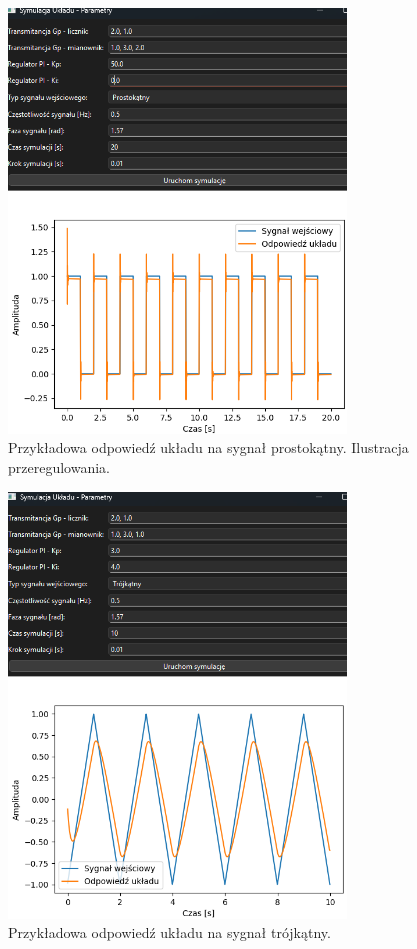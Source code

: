 \documentclass[12pt,a4paper]{article}
\begin{document}
\begin{figure}[h!]
    \centering
    \includegraphics[width=0.8\textwidth]{wykres3.png}
    \caption{Przykładowa odpowiedź układu na sygnał prostokątny. Ilustracja przeregulowania.}
\end{figure}

\begin{figure}[h!]
    \centering
    \includegraphics[width=0.8\textwidth]{wykres5.png}
    \caption{Przykładowa odpowiedź układu na sygnał trójkątny.}
\end{figure}
\end{document}
